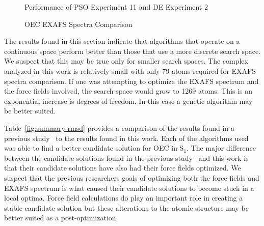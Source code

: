 \begin{figure}
	\centering
	\caption{Performance of PSO Experiment 11 and DE Experiment 2}
	\label{fig:generational-data-pso-de}
\end{figure}

\begin{figure*}
	\centering
	\caption{OEC EXAFS Spectra Comparison}
	\label{fig:pso-best}
\end{figure*}

The results found in this section indicate that algorithms that operate on a continuous space perform better than those that use a more discrete search space. We suspect that this may be true only for smaller search spaces. The complex analyzed in this work is relatively small with only 79 atoms required for EXAFS spectra comparison. If one was attempting to optimize the EXAFS spectrum and the force fields involved, the search space would grow to 1269 atoms. This is an exponential increase is degrees of freedom. In this case a genetic algorithm may be better suited.

Table~\ref{fig:summary-rmsd} provides a comparison of the results found in a previous study~\cite{luber2011s1} to the results found in this work. Each of the algorithms used was able to find a better candidate solution for OEC in S$_{1}$. The major difference between the candidate solutions found in the previous study~\cite{luber2011s1} and this work is that their candidate solutions have also had their force fields optimized. We suspect that the previous researchers goals of optimizing both the force fields and EXAFS spectrum is what caused their candidate solutions to become stuck in a local optima. Force field calculations do play an important role in creating a stable candidate solution but these alterations to the atomic structure may be better suited as a post-optimization.


